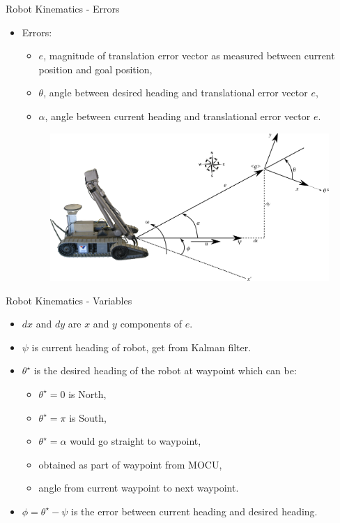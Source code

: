 \documentclass[hyperref={pdfpagelabels=false}]{beamer}
\begin{document}
\begin{frame}{Robot Kinematics - Errors}
\begin{itemize}
\item Errors:
\begin{itemize}
\item $e$, magnitude of translation error vector as measured between current position and goal position,
\item $\theta$, angle between desired heading and translational error vector $e$,
\item $\alpha$, angle between current heading and translational error vector $e$.
\end{itemize}

\begin{figure}[ht!]
	\centering
	\includegraphics[width=.75\textwidth]{images/packbotlyapunov}
\end{figure}

\end{itemize}
\end{frame}

\begin{frame}{Robot Kinematics - Variables}
\begin{itemize}
\item $dx$ and $dy$ are $x$ and $y$ components of $e$.
\item $\psi$ is current heading of robot, get from Kalman filter.
\item $\theta^\star$ is the desired heading of the robot at waypoint which can be:
\begin{itemize}
\item $\theta^\star=0$ is North,
\item $\theta^\star=\pi$ is South,
\item $\theta^\star=\alpha$ would go straight to waypoint,
\item obtained as part of waypoint from MOCU,
\item angle from current waypoint to next waypoint.
\end{itemize}
\item $\phi=\theta^\star-\psi$ is the error between current heading and desired heading.
\end{itemize}
\end{frame}
\end{document}
